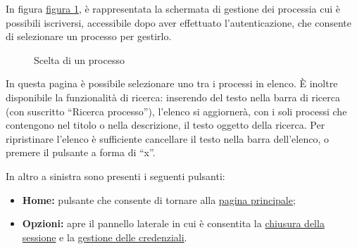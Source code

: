 In figura \hyperref[fig:Fprocesses]{figura \ref{fig:Fprocesses}}, è rappresentata la schermata di gestione dei processia cui è possibili iscriversi, accessibile dopo aver effettuato l'autenticazione, che consente di selezionare un processo per gestirlo.

\begin{figure}[H] \centering 
{} \caption{Scelta di un processo}
\label{fig:Fprocesses}
\end{figure}

In questa pagina è possibile selezionare uno tra i processi in elenco. È inoltre disponibile la funzionalità di ricerca: inserendo del testo nella barra di ricerca (con suscritto ``Ricerca processo''), l'elenco si aggiornerà, con i soli processi che contengono nel titolo o nella descrizione, il testo oggetto della ricerca.
Per ripristinare l'elenco è sufficiente cancellare il testo nella barra dell'elenco, o premere il pulsante a forma di ``x''.

In altro a sinistra sono presenti i seguenti pulsanti:
\begin{itemize}
\item \textbf{Home:} pulsante che consente di tornare alla \hyperref[home]{pagina principale};
\item \textbf{Opzioni:} apre il pannello laterale in cui è consentita la \hyperref[logout]{chiusura della sessione} e la \hyperref[userdata]{gestione delle credenziali}.
\end{itemize}

